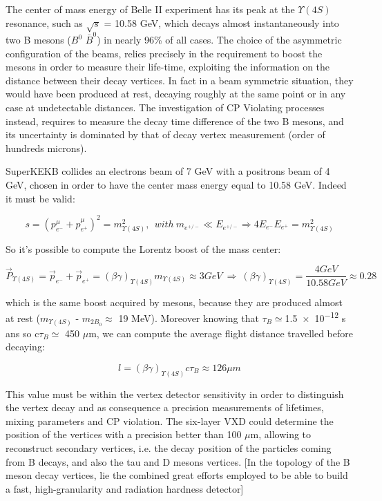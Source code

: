 The center of mass energy of Belle II experiment has its peak at the $\Upsilon(4S)$ resonance, such as $\sqrt{s}$ = 10.58 GeV, which decays almost instantaneously into two B mesons ($B^{0}$ $\bar{B}^{0}$) in nearly 96\% of all cases. The choice of the asymmetric configuration of the beams, relies precisely in the requirement to boost the mesons in order to measure their life-time, exploiting the information on the distance between their decay vertices. In fact in a beam symmetric situation, they would have been produced at rest, decaying roughly at the same point or in any case at undetectable distances. The investigation of CP Violating processes instead, requires to measure the decay time difference of the two B mesons, and its uncertainty is dominated by that of decay vertex measurement (order of hundreds microns). 

SuperKEKB collides an electrons beam of 7 GeV with a positrons beam of 4 GeV, chosen in order to have the center mass energy equal to 10.58 GeV. Indeed it must be valid:

\begin{equation}
s = (p_{{e}^{-}}^{\mu} + p_{{e}^{+}}^{\mu})^{2} = m^{2}_{\Upsilon(4S)},\ \ with\  m_{e^{+/-}} \ll E_{{e}^{+/-}}  \Rightarrow 4E_{{e}^{-}}E_{{e}^{+}} = m^{2}_{\Upsilon(4S)}
\end{equation}

So it's possible to compute the Lorentz boost of the mass center:

\begin{equation}
\vec{P}_{\Upsilon(4S)} = \vec{p}_{{e}^{-}} + \vec{p}_{{e}^{+}} = (\beta\gamma)_{\Upsilon(4S)}m_{\Upsilon(4S)} \approx 3 GeV \  \Rightarrow \  (\beta\gamma)_{\Upsilon(4S)} = \frac{4 GeV}{10.58 GeV} \approx 0.28
\end{equation}

which is the same boost acquired by mesons, because they are produced almost at rest ($m_{\Upsilon(4S)}$ - $m_{2B_{0}}\approx$ 19 MeV). Moreover knowing that $\tau_{B}\simeq $\num{1.5e-12} s ans so c$\tau_{B}\simeq$ 450 $\mu$m, we can compute the average flight distance travelled before decaying:

\begin{equation}
\textit{l} = (\beta\gamma)_{\Upsilon(4S)}c\tau_{B} \approx 126 \mu m  
\end{equation} 

This value must be within the vertex detector sensitivity in order to distinguish the vertex decay and as consequence a precision measurements of lifetimes, mixing parameters and CP violation. The six-layer VXD could determine the position of the vertices with a precision better than 100 $\mu$m, allowing to reconstruct secondary vertices, i.e. the decay position of the particles coming from B decays, and also the tau and D mesons vertices.
[In the topology of the B meson decay vertices, lie the combined great efforts employed to be able to build a fast, high-granularity and radiation hardness detector]

